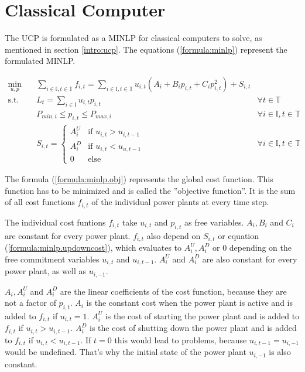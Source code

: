 \section{Classical Computer}

The UCP is formulated as a MINLP for classical computers to solve,
as mentioned in section \ref{intro:ucp}.
The equations (\ref{formula:minlp}) represent the formulated MINLP.

\begin{subequations}
\begin{align}
  \min_{u, p} \quad &
  \sum_{i \in \mathbb{I}, t \in \mathbb{T}} f_{i, t}
  = \sum_{i \in \mathbb{I}, t \in \mathbb{T}}
    u_{i, t} (A_i + B_i p_{i, t} + C_i p_{i, t}^2) + S_{i, t}
  \label{formula:minlp.obj} \\
  \text{s.t.} \quad & L_t = \sum_{i \in \mathbb{I}} u_{i, t} p_{i, t} \quad &
  \forall t \in \mathbb{T}
  \label{formula:minlp.load} \\
  &
  P_{min, i} \leq p_{i, t} \leq P_{max, i} \quad &
  \forall i \in \mathbb{I}, t \in \mathbb{T}
  \label{formula:minlp.power} \\
  &
  S_{i, t} = \begin{cases}
    A_i^U & \text{if } u_{i, t} > u_{i, t-1} \\
    A_i^D & \text{if } u_{i, t} < u_{u, t-1} \\
    0 & \text{else}
  \end{cases} \quad &
  \forall i \in \mathbb{I}, t \in \mathbb{T}
  \label{formula:minlp.updowncost}
\end{align}
\label{formula:minlp}
\end{subequations}

The formula (\ref{formula:minlp.obj}) represents the global cost function.
This function has to be minimized and is called the ''objective function''.
It is the sum of all cost functions $f_{i, t}$ of the individual power plants at every time step.

The individual cost funtions $f_{i, t}$ take $u_{i, t}$ and $p_{i, t}$ as free variables.
$A_i, B_i$ and $C_i$ are constant for every power plant.
$f_{i, t}$ also depend on $S_{i, t}$ or equation (\ref{formula:minlp.updowncost}),
which evaluates to $A_i^U, A_i^D$ or $0$ depending on the free commitment variables $u_{i, t}$ and $u_{i, t-1}$.
$A_i^U$ and $A_i^D$ are also constant for every power plant,
as well as $u_{i, -1}$.

$A_i, A_i^U$ and $A_i^D$ are the linear coefficients of the cost function,
because they are not a factor of $p_{i, t}$.
$A_i$ is the constant cost when the power plant is active
and is added to $f_{i, t}$ if $u_{i, t} = 1$.
$A_i^U$ is the cost of starting the power plant
and is added to $f_{i, t}$ if $u_{i, t} > u_{i, t-1}$.
$A_i^D$ is the cost of shutting down the power plant
and is added to $f_{i, t}$ if $u_{i, t} < u_{i, t-1}$.
If $t = 0$ this would lead to problems, because $u_{i, t-1} = u_{i, -1}$ would be undefined.
That's why the initial state of the power plant $u_{i, -1}$ is also constant.

